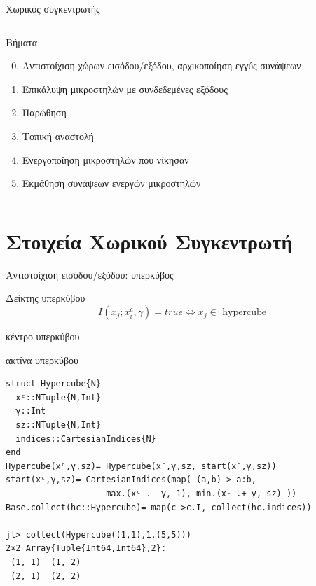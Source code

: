 \documentclass[10pt,lualatex]{beamer}
\begin{document}
\begin{frame}{Χωρικός συγκεντρωτής}
{\begin{columns}
\begin{block}{Βήματα}
\begin{enumerate}
        \setcounter{enumi}{-1}
        \item \alert<3>{Αντιστοίχιση χώρων εισόδου/εξόδου, αρχικοποίηση εγγύς συνάψεων}
        \item \alert<3>{Επικάλυψη μικροστηλών με συνδεδεμένες εξόδους}
        \item Παρώθηση
        \item Τοπική αναστολή
        \item Ενεργοποίηση μικροστηλών που νίκησαν
        \item \alert<3>{Εκμάθηση συνάψεων ενεργών μικροστηλών}
      \end{enumerate}
    \end{block}
  \end{columns}
  }
\end{frame}

\section{Στοιχεία Χωρικού Συγκεντρωτή}

\begin{frame}[fragile]{Αντιστοίχιση εισόδου/εξόδου: υπερκύβος}
\begin{block}{Δείκτης υπερκύβου}
  \[ I(x_j; x_i^c, γ) = \mathit{true} \iff x_j \in \text{ hypercube} \]
  \vspace{-2.2\topsep}
  \begin{description}[ddddd]
		\small
    \item[$x^c$] κέντρο υπερκύβου
    \item[$γ$] ακτίνα υπερκύβου
  \end{description}
\end{block}
\pause
\begin{verbatim}
struct Hypercube{N}
  xᶜ::NTuple{N,Int}
  γ::Int
  sz::NTuple{N,Int}
  indices::CartesianIndices{N}
end
Hypercube(xᶜ,γ,sz)= Hypercube(xᶜ,γ,sz, start(xᶜ,γ,sz))
start(xᶜ,γ,sz)= CartesianIndices(map( (a,b)-> a:b,
                    max.(xᶜ .- γ, 1), min.(xᶜ .+ γ, sz) ))
Base.collect(hc::Hypercube)= map(c->c.I, collect(hc.indices))

jl> collect(Hypercube((1,1),1,(5,5)))
2×2 Array{Tuple{Int64,Int64},2}:
 (1, 1)  (1, 2)
 (2, 1)  (2, 2)
\end{verbatim}
\end{frame}
\end{document}
